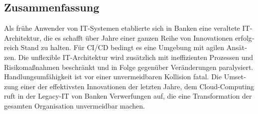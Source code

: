 \begin{otherlanguage}{ngerman}
	\chapter*{Zusammenfassung}
	Als frühe Anwender von IT-Systemen etablierte sich in Banken eine veraltete IT-Architektur, die es schafft über Jahre einer ganzen Reihe von Innovationen erfolgreich Stand zu halten. 
	Für CI/CD bedingt es eine Umgebung mit agilen Ansätzen. Die unflexible IT-Architektur wird zusätzlich mit ineffizienten Prozessen und Risikomaßnahmen beschränkt und in Folge gegenüber Veränderungen paralysiert. Handlungsumfähigkeit ist vor einer unvermeidbaren Kollision fatal.
	Die Umsetzung einer der effektivsten Innovationen der letzten Jahre, dem Cloud-Computing ruft in der Legacy-IT von Banken Verwerfungen auf, die eine Transformation der gesamten Organisation unvermeidbar machen.
	\end{otherlanguage}
